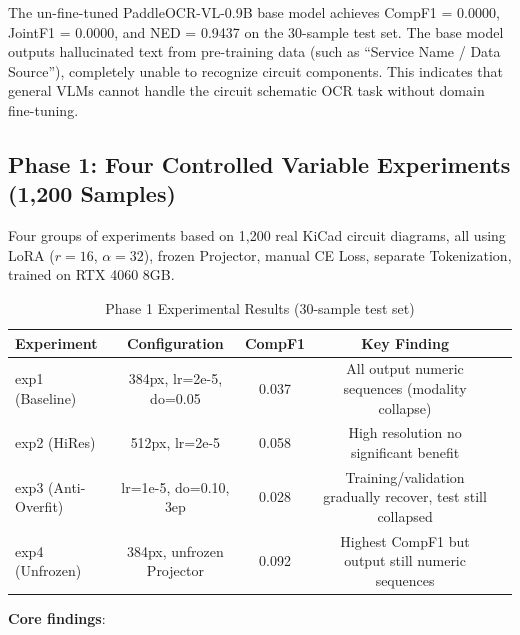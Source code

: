 The un-fine-tuned PaddleOCR-VL-0.9B base model achieves CompF1 = 0.0000, JointF1 = 0.0000, and NED = 0.9437 on the 30-sample test set. The base model outputs hallucinated text from pre-training data (such as ``Service Name / Data Source''), completely unable to recognize circuit components. This indicates that general VLMs cannot handle the circuit schematic OCR task without domain fine-tuning.

\subsection{Phase 1: Four Controlled Variable Experiments (1,200 Samples)}

Four groups of experiments based on 1,200 real KiCad circuit diagrams, all using LoRA ($r=16$, $\alpha=32$), frozen Projector, manual CE Loss, separate Tokenization, trained on RTX 4060 8GB.

\begin{table}[h]
\centering
\caption{Phase 1 Experimental Results (30-sample test set)}
\begin{tabular}{lcccc}
\toprule
\textbf{Experiment} & \textbf{Configuration} & \textbf{CompF1} & \textbf{Key Finding} \\
\midrule
exp1 (Baseline) & 384px, lr=2e-5, do=0.05 & 0.037 & All output numeric sequences (modality collapse) \\
exp2 (HiRes)    & 512px, lr=2e-5           & 0.058 & High resolution no significant benefit \\
exp3 (Anti-Overfit) & lr=1e-5, do=0.10, 3ep & 0.028 & Training/validation gradually recover, test still collapsed \\
exp4 (Unfrozen)  & 384px, unfrozen Projector & 0.092 & Highest CompF1 but output still numeric sequences \\
\bottomrule
\end{tabular}
\end{table}

\textbf{Core findings}:


